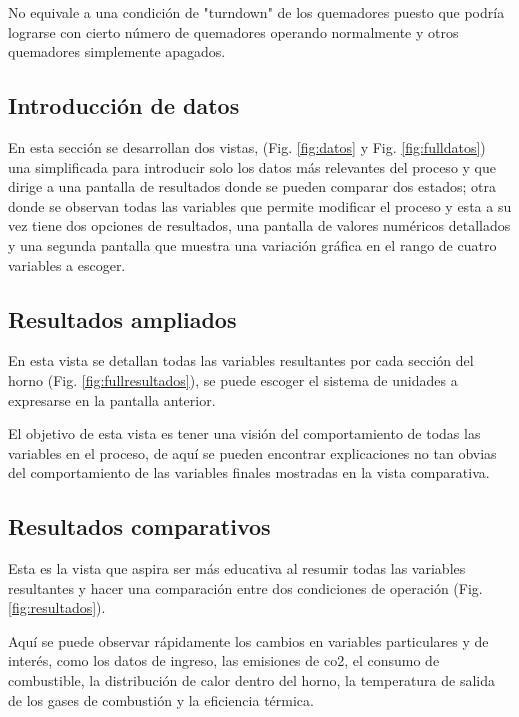 \par *No equivale a una condición de "turndown" de los quemadores puesto que podría lograrse con cierto número de quemadores operando normalmente y otros quemadores simplemente apagados.

\subsection{Introducción de datos}

\par En esta sección se desarrollan dos vistas, (Fig. \ref{fig:datos} y Fig. \ref{fig:fulldatos}) una simplificada para introducir solo los datos más relevantes del proceso y que dirige a una pantalla de resultados donde se pueden comparar dos estados; otra donde se observan todas las variables que permite modificar el proceso y esta a su vez tiene dos opciones de resultados, una pantalla de valores numéricos detallados y una segunda pantalla que muestra una variación gráfica en el rango de cuatro variables a escoger.  

\subsection{Resultados ampliados}

\par En esta vista se detallan todas las variables resultantes por cada sección del horno (Fig. \ref{fig:fullresultados}), se puede escoger el sistema de unidades a expresarse en la pantalla anterior.
\par El objetivo de esta vista es tener una visión del comportamiento de todas las variables en el proceso, de aquí se pueden encontrar explicaciones no tan obvias del comportamiento de las variables finales mostradas en la vista comparativa.

\subsection{Resultados comparativos}

\par Esta es la vista que aspira ser más educativa al resumir todas las variables resultantes y hacer una comparación entre dos condiciones de operación (Fig. \ref{fig:resultados}).
\par Aquí se puede observar rápidamente los cambios en variables particulares y de interés, como los datos de ingreso, las emisiones de \ac{co2}, el consumo de combustible, la distribución de calor dentro del horno, la temperatura de salida de los gases de combustión y la eficiencia térmica.

